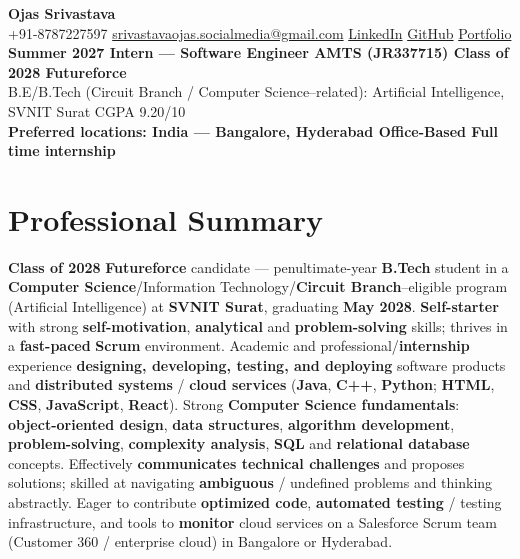 \documentclass[a4paper,10pt]{article}
\begin{document}
\selectfont

\begin{center}
  {\LARGE \textbf{Ojas Srivastava}} \\[0.8mm]
  \small
  +91-8787227597 \textbar{}
  \href{mailto:srivastavaojas.socialmedia@gmail.com}{srivastavaojas.socialmedia@gmail.com} \textbar{}
  \href{https://linkedin.com/in/ojas-srivastava05}{LinkedIn} \textbar{}
  \href{https://github.com/Ojas-Srivastava05}{GitHub} \textbar{}
  \href{https://ojas-srivastava.vercel.app}{Portfolio} \\[0.4mm]
  \textbf{Summer 2027 Intern --- Software Engineer AMTS (JR337715) \textbar{} Class of 2028 \textbar{} Futureforce} \\[0.2mm]
  B.E/B.Tech (Circuit Branch / Computer Science--related): Artificial Intelligence, SVNIT Surat \textbar{} CGPA 9.20/10 \\[0.2mm]
  \textbf{Preferred locations: India --- Bangalore, Hyderabad \textbar{} Office-Based \textbar{} Full time internship}
\end{center}

\vspace{-0.8mm}

\section{Professional Summary}
\small
\textbf{Class of 2028} \textbf{Futureforce} candidate --- penultimate-year \textbf{B.Tech} student in a \textbf{Computer Science}/Information Technology/\textbf{Circuit Branch}--eligible program (Artificial Intelligence) at \textbf{SVNIT Surat}, graduating \textbf{May 2028}. \textbf{Self-starter} with strong \textbf{self-motivation}, \textbf{analytical} and \textbf{problem-solving} skills; thrives in a \textbf{fast-paced} \textbf{Scrum} environment. Academic and professional/\textbf{internship} experience \textbf{designing, developing, testing, and deploying} software products and \textbf{distributed systems} / \textbf{cloud services} (\textbf{Java}, \textbf{C++}, \textbf{Python}; \textbf{HTML}, \textbf{CSS}, \textbf{JavaScript}, \textbf{React}). Strong \textbf{Computer Science fundamentals}: \textbf{object-oriented design}, \textbf{data structures}, \textbf{algorithm development}, \textbf{problem-solving}, \textbf{complexity analysis}, \textbf{SQL} and \textbf{relational database} concepts. Effectively \textbf{communicates technical challenges} and proposes solutions; skilled at navigating \textbf{ambiguous} / undefined problems and thinking abstractly. Eager to contribute \textbf{optimized code}, \textbf{automated testing} / testing infrastructure, and tools to \textbf{monitor} cloud services on a Salesforce Scrum team (Customer 360 / enterprise cloud) in Bangalore or Hyderabad.
\end{document}
